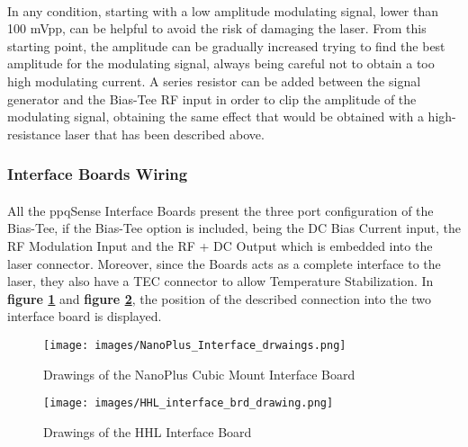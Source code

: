 \paragraph{} In any condition, starting with a low amplitude modulating signal, lower than 100 mVpp, can be helpful to avoid the risk of damaging the laser. From this starting point, the amplitude can be gradually increased trying to find the best amplitude for the modulating signal, always being careful not to obtain a too high modulating current.
\newline A series resistor can be added between the signal generator and the Bias-Tee RF input in order to clip the amplitude of the modulating signal, obtaining the same effect that would be obtained with a high-resistance laser that has been described above.





\subsubsection{Interface Boards Wiring} \label{cpt:intfc_brd_wirings}
\paragraph{} All the ppqSense Interface Boards present the three port configuration of the Bias-Tee, if the Bias-Tee option is included, being the DC Bias Current input, the RF Modulation Input and the RF + DC Output which is embedded into the laser connector. Moreover, since the Boards acts as a complete interface to the laser, they also have a TEC connector to allow Temperature Stabilization.
\newline In \textbf{figure \ref{img:nanoplus_interface_drawing}} and \textbf{figure \ref{img:HHL_interface_drawing}}, the position of the described connection into the two interface board is displayed.
\begin{figure}[h]
    \centering
    \texttt{[image: images/NanoPlus\_Interface\_drwaings.png]}
    \caption{Drawings of the NanoPlus Cubic Mount Interface Board}
    \label{img:nanoplus_interface_drawing}
\end{figure}

\begin{figure}[h]
    \centering
    \texttt{[image: images/HHL\_interface\_brd\_drawing.png]}
    \caption{Drawings of the HHL Interface Board}
    \label{img:HHL_interface_drawing}
\end{figure}